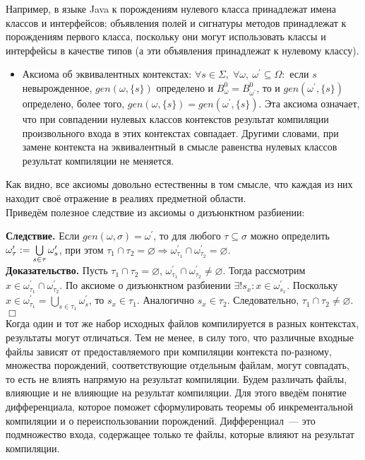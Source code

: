 Например, в языке Java к порождениям нулевого класса принадлежат имена классов и интерфейсов; объявления полей и сигнатуры методов принадлежат к порождениям первого класса, поскольку они могут использовать классы и интерфейсы в качестве типов (а эти объявления принадлежат к нулевому классу).

\begin{itemize}
	\item Аксиома об эквивалентных контекстах: $\forall s \in \Sigma,\; \forall \omega,\: \omega^\prime \subseteq \Omega:$ если $s$ невырожденное, $gen(\omega, \{s\})$ определено и $B^0_{\omega} = B^0_{\omega^\prime}$, то и $gen(\omega^\prime, \{s\})$ определено, более того, $gen(\omega, \{s\}) = gen(\omega^\prime, \{s\})$. Эта аксиома означает, что при совпадении нулевых классов контекстов результат компиляции произвольного входа в этих контекстах совпадает. Другими словами, при замене контекста на эквивалентный в смысле равенства нулевых классов результат компиляции не меняется.
\end{itemize}

Как видно, все аксиомы довольно естественны в том смысле, что каждая из них находит своё отражение в реалиях предметной области.\\

Приведём полезное следствие из аксиомы о дизъюнктном разбиении:

\textbf{Следствие.}
Если $gen(\omega, \sigma) = \omega^\prime$, то для любого $\tau \subseteq \sigma$ можно определить $\omega^\prime_\tau := \bigcup\limits_{s\in\tau}\omega^\prime_s$, при этом $\tau_1 \cap \tau_2 = \varnothing \Rightarrow \omega^\prime_{\tau_1} \cap \omega^\prime_{\tau_2} = \varnothing$.\\

\textbf{Доказательство.} Пусть $\tau_1 \cap \tau_2 = \varnothing$, $\omega^\prime_{\tau_1} \cap \omega^\prime_{\tau_2} \neq \varnothing$. Тогда рассмотрим $x \in \omega^\prime_{\tau_1} \cap \omega^\prime_{\tau_2}$. По аксиоме о дизъюнктном разбиении $\exists ! s_x: x \in \omega^\prime_{s_x}$. Поскольку $x \in \omega^\prime_{\tau_1} = \bigcup\limits_{s\in\tau_1}\omega^\prime_s$, то $s_x \in \tau_1$. Аналогично $s_x \in \tau_2$. Следовательно, $\tau_1 \cap \tau_2 \neq \varnothing$. $\Box$\\


Когда один и тот же набор исходных файлов компилируется в разных контекстах, результаты могут отличаться. Тем не менее, в силу того, что различные входные файлы зависят от предоставляемого при компиляции контекста по-разному, множества порождений, соответствующие отдельным файлам, могут совпадать, то есть не влиять напрямую на результат компиляции. Будем различать файлы, влияющие и не влияющие на результат компиляции. Для этого введём понятие дифференциала, которое поможет сформулировать теоремы об инкрементальной компиляции и о переиспользовании порождений. Дифференциал~--- это подмножество входа, содержащее только те файлы, которые влияют на результат компиляции.

